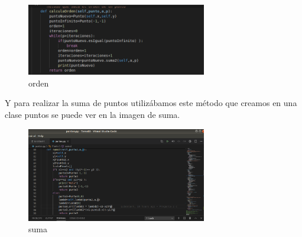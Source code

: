 \documentclass[10pt,a4paper]{article}
\begin{document}
\begin{enumerate}
\begin{itemize}
\begin{figure}
\includegraphics[width=0.7\textwidth]{orden.png}
\caption{orden}
\label{fig:orden}

\end{figure}

Y para realizar la suma de puntos utilizábamos este método que creamos en una clase puntos se puede ver en la imagen de suma.  
\begin{figure}
\includegraphics[width=0.7\textwidth]{suma.png}
\caption{suma}
\label{fig:orden}


\end{figure}
\end{itemize}
\end{enumerate}
\end{document}
